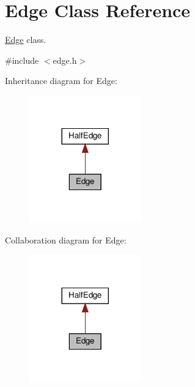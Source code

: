 \hypertarget{classEdge}{}\section{Edge Class Reference}
\label{classEdge}


\hyperlink{classEdge}{Edge} class.  




{\ttfamily \#include $<$edge.\+h$>$}



Inheritance diagram for Edge\+:
\nopagebreak
\begin{figure}[H]
\begin{center}
\leavevmode
\includegraphics[width=137pt]{classEdge__inherit__graph}
\end{center}
\end{figure}


Collaboration diagram for Edge\+:
\nopagebreak
\begin{figure}[H]
\begin{center}
\leavevmode
\includegraphics[width=137pt]{classEdge__coll__graph}
\end{center}
\end{figure}
